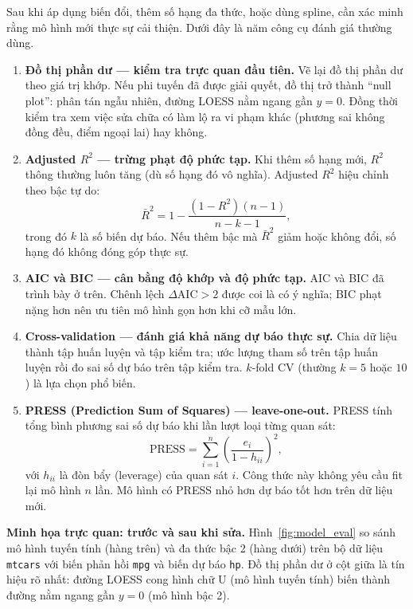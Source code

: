 Sau khi áp dụng biến đổi, thêm số hạng đa thức, hoặc dùng spline, cần xác minh rằng mô hình mới thực sự cải thiện. Dưới đây là năm công cụ đánh giá thường dùng.

\begin{enumerate}

  \item \textbf{Đồ thị phần dư — kiểm tra trực quan đầu tiên.}
  Vẽ lại đồ thị phần dư theo giá trị khớp. Nếu phi tuyến đã được giải quyết, đồ thị trở thành ``null plot'': phân tán ngẫu nhiên, đường LOESS nằm ngang gần $y=0$. Đồng thời kiểm tra xem việc sửa chữa có làm lộ ra vi phạm khác (phương sai không đồng đều, điểm ngoại lai) hay không.

  \item \textbf{Adjusted $R^2$ — trừng phạt độ phức tạp.}
  Khi thêm số hạng mới, $R^2$ thông thường luôn tăng (dù số hạng đó vô nghĩa). Adjusted $R^2$ hiệu chỉnh theo bậc tự do:
  \[
    \bar{R}^2 = 1 - \frac{(1-R^2)(n-1)}{n-k-1},
  \]
  trong đó $k$ là số biến dự báo. Nếu thêm bậc mà $\bar{R}^2$ giảm hoặc không đổi, số hạng đó không đóng góp thực sự.

  \item \textbf{AIC và BIC — cân bằng độ khớp và độ phức tạp.}
  AIC và BIC đã trình bày ở trên. Chênh lệch $\Delta\text{AIC} > 2$ được coi là có ý nghĩa; BIC phạt nặng hơn nên ưu tiên mô hình gọn hơn khi cỡ mẫu lớn.

  \item \textbf{Cross-validation — đánh giá khả năng dự báo thực sự.}
  Chia dữ liệu thành tập huấn luyện và tập kiểm tra; ước lượng tham số trên tập huấn luyện rồi đo sai số dự báo trên tập kiểm tra. $k$-fold CV (thường $k=5$ hoặc $10$) là lựa chọn phổ biến.

  \item \textbf{PRESS (Prediction Sum of Squares) — leave-one-out.}
  PRESS tính tổng bình phương sai số dự báo khi lần lượt loại từng quan sát:
  \[
    \text{PRESS} = \sum_{i=1}^n \left(\frac{e_i}{1 - h_{ii}}\right)^2,
  \]
  với $h_{ii}$ là đòn bẩy (leverage) của quan sát $i$. Công thức này không yêu cầu fit lại mô hình $n$ lần. Mô hình có PRESS nhỏ hơn dự báo tốt hơn trên dữ liệu mới.

\end{enumerate}

\medskip
\noindent\textbf{Minh họa trực quan: trước và sau khi sửa.}
Hình~\ref{fig:model_eval} so sánh mô hình tuyến tính (hàng trên) và đa thức bậc 2 (hàng dưới) trên bộ dữ liệu \texttt{mtcars} với biến phản hồi \texttt{mpg} và biến dự báo \texttt{hp}. Đồ thị phần dư ở cột giữa là tín hiệu rõ nhất: đường LOESS cong hình chữ U (mô hình tuyến tính) biến thành đường nằm ngang gần $y=0$ (mô hình bậc 2).

